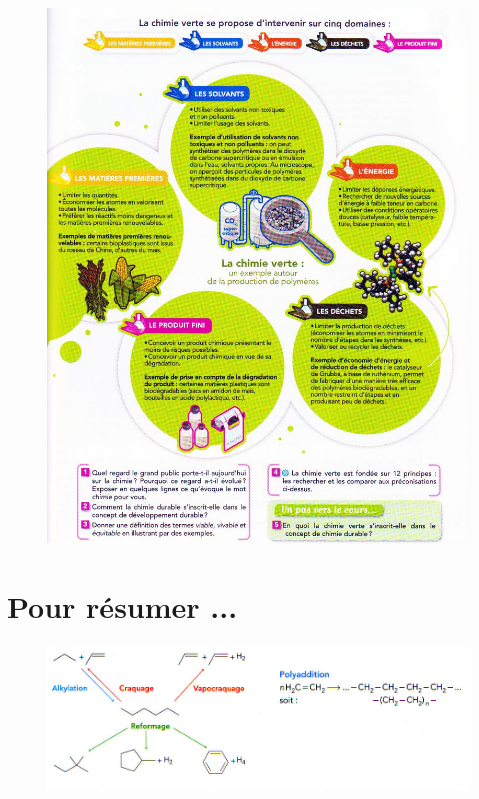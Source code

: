 \documentclass[11pt,a4paper]{article}
\begin{document}
\begin{figure}[H]
    \centering
    \includegraphics[width=\linewidth]{imgs/c5/vert2.jpg}
\end{figure} 

\section*{Pour résumer ... }

\begin{figure}[H]
    \centering
    \includegraphics[width=0.95\linewidth]{imgs/c5/synthRECAP.jpg}
\end{figure}
\end{document}
